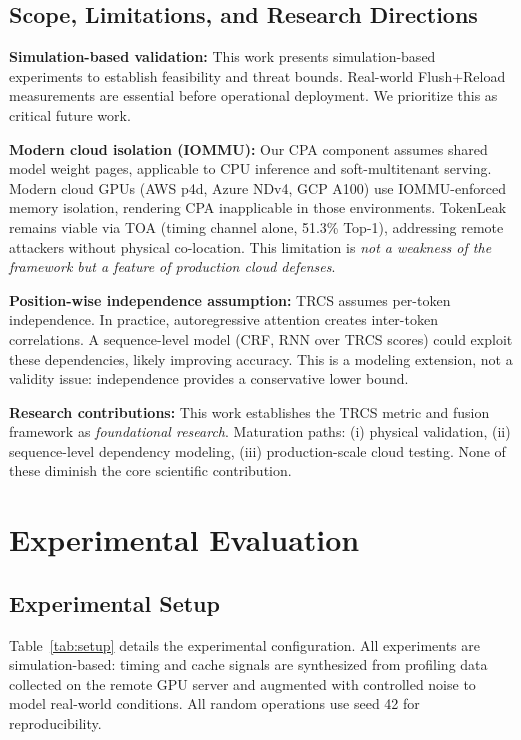 \documentclass[journal,10pt,twocolumn]{IEEEtran}
\begin{document}
\subsection{Scope, Limitations, and Research Directions}

\textbf{Simulation-based validation:} This work presents simulation-based
experiments to establish feasibility and threat bounds. Real-world
Flush+Reload measurements are essential before operational deployment.
We prioritize this as critical future work.

\textbf{Modern cloud isolation (IOMMU):} Our CPA component assumes shared
model weight pages, applicable to CPU inference and soft-multitenant serving.
Modern cloud GPUs (AWS p4d, Azure NDv4, GCP A100) use IOMMU-enforced memory
isolation, rendering CPA inapplicable in those environments. TokenLeak remains
viable via TOA (timing channel alone, 51.3\% Top-1), addressing remote attackers
without physical co-location. This limitation is \emph{not a weakness of the
framework but a feature of production cloud defenses}.

\textbf{Position-wise independence assumption:} TRCS assumes per-token independence.
In practice, autoregressive attention creates inter-token correlations. A
sequence-level model (CRF, RNN over TRCS scores) could exploit these
dependencies, likely improving accuracy. This is a modeling extension, not a
validity issue: independence provides a conservative lower bound.

\textbf{Research contributions:} This work establishes the TRCS metric and
fusion framework as \emph{foundational research}. Maturation paths: (i) physical
validation, (ii) sequence-level dependency modeling, (iii) production-scale
cloud testing. None of these diminish the core scientific contribution.

\section{Experimental Evaluation}
\label{sec:eval}

\subsection{Experimental Setup}

Table~\ref{tab:setup} details the experimental configuration.
All experiments are simulation-based: timing and cache signals
are synthesized from profiling data collected on the remote
GPU server and augmented with controlled noise to model
real-world conditions. All random operations use seed 42
for reproducibility.
\end{document}

